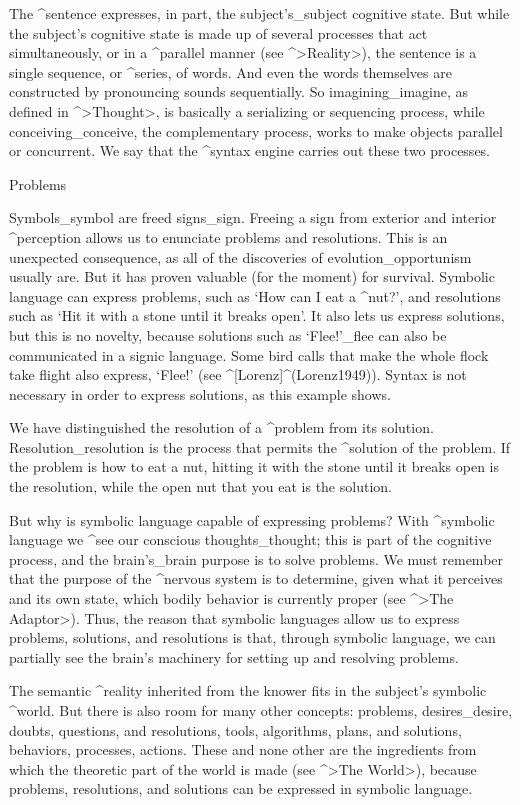 The ^{sentence} expresses, in part, the subject's_{subject} cognitive
state. But while the subject's cognitive state is made up of several
processes that act simultaneously, or in a ^{parallel} manner (see
^>Reality>), the sentence is a single sequence, or ^{series}, of words.
And even the words themselves are constructed by pronouncing sounds
sequentially. So imagining_{imagine}, as defined in ^>Thought>, is
basically a serializing or sequencing process, while
conceiving_{conceive}, the complementary process, works to make objects
parallel or concurrent. We say that the ^{syntax engine} carries out
these two processes.


\Section Problems

Symbols_{symbol} are freed signs_{sign}. Freeing a sign from exterior
and interior ^{perception} allows us to enunciate problems and
resolutions. This is an unexpected consequence, as all of the
discoveries of evolution_{opportunism} usually are. But it has proven
valuable (for the moment) for survival. Symbolic language can express
problems, such as `How can I eat a ^{nut}?', and resolutions such as
`Hit it with a stone until it breaks open'. It also lets us express
solutions, but this is no novelty, because solutions such as
`Flee!'_{flee} can also be communicated in a signic language. Some bird
calls that make the whole flock take flight also express, `Flee!' (see
^[Lorenz]^(Lorenz1949)). Syntax is not necessary in order to express
solutions, as this example shows.

We have distinguished the resolution of a ^{problem} from its solution.
Resolution_{resolution} is the process that permits the ^{solution} of
the problem. If the problem is how to eat a nut, hitting it with the
stone until it breaks open is the resolution, while the open nut that
you eat is the solution.

But why is symbolic language capable of expressing problems?  With
^{symbolic language} we ^{see} our conscious thoughts_{thought}; this is
part of the cognitive process, and the brain's_{brain} purpose is to
solve problems. We must remember that the purpose of the ^{nervous
system} is to determine, given what it perceives and its own state,
which bodily behavior is currently proper (see ^>The Adaptor>). Thus,
the reason that symbolic languages allow us to express problems,
solutions, and resolutions is that, through symbolic language, we can
partially see the brain's machinery for setting up and resolving
problems.

The semantic ^{reality} inherited from the knower fits in the subject's
symbolic ^{world}. But there is also room for many other concepts:
problems, desires_{desire}, doubts, questions, and resolutions, tools,
algorithms, plans, and solutions, behaviors, processes, actions. These
and none other are the ingredients from which the theoretic part of the
world is made (see ^>The World>), because problems, resolutions, and
solutions can be expressed in symbolic language.

